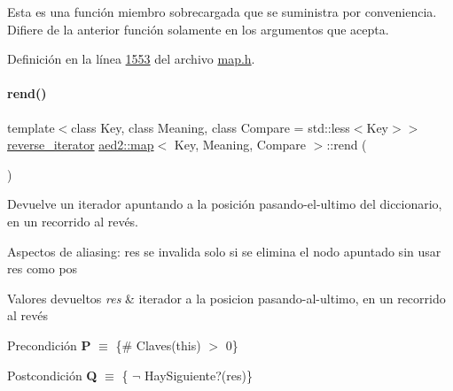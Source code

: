 Esta es una función miembro sobrecargada que se suministra por conveniencia. Difiere de la anterior función solamente en los argumentos que acepta. 

Definición en la línea \hyperlink{map_8h_source_l01553}{1553} del archivo \hyperlink{map_8h_source}{map.\+h}.

\mbox{\label{classaed2_1_1map_a277f03b4f4b6b98879e4e4921081801f_a277f03b4f4b6b98879e4e4921081801f}} 
\paragraph{\texorpdfstring{rend()}{rend()}\hspace{0.1cm}{\footnotesize\ttfamily [1/2]}}
{\footnotesize\ttfamily template$<$class Key, class Meaning, class Compare = std\+::less$<$\+Key$>$$>$ \\
\hyperlink{classaed2_1_1map_a8e6a592062260177fd73b2f9897b1dd5_a8e6a592062260177fd73b2f9897b1dd5}{reverse\+\_\+iterator} \hyperlink{classaed2_1_1map}{aed2\+::map}$<$ Key, Meaning, Compare $>$\+::rend (\begin{DoxyParamCaption}{ }\end{DoxyParamCaption})\hspace{0.3cm}{\ttfamily [inline]}}



Devuelve un iterador apuntando a la posición pasando-\/el-\/ultimo del diccionario, en un recorrido al revés. 

\begin{DoxyParagraph}{Aspectos de aliasing\+:}
res se invalida solo si se elimina el nodo apuntado sin usar res como pos
\end{DoxyParagraph}

\begin{DoxyRetVals}{Valores devueltos}
{\em res} & iterador a la posicion pasando-\/al-\/ultimo, en un recorrido al revés\\
\hline
\end{DoxyRetVals}
\begin{DoxyPrecond}{Precondición}
{\bfseries P} $\equiv$ \{\# Claves(this) $>$ 0\} 
\end{DoxyPrecond}
\begin{DoxyPostcond}{Postcondición}
{\bfseries Q} $\equiv$ \{ $\lnot$ Hay\+Siguiente?(res)\}
\end{DoxyPostcond}

